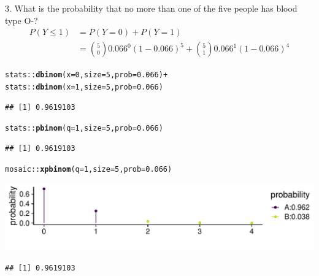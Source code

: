 \documentclass[10pt]{beamer}\usepackage[]{graphicx}\usepackage[]{color}
\makeatletter
\def\maxwidth{ %
  \ifdim\Gin@nat@width>\linewidth
    \linewidth
  \else
    \Gin@nat@width
  \fi
}
\newcommand{\hlnum}[1]{\textcolor[rgb]{0.686,0.059,0.569}{#1}}%
\newcommand{\hlopt}[1]{\textcolor[rgb]{0,0,0}{#1}}%
\newcommand{\hlstd}[1]{\textcolor[rgb]{0.345,0.345,0.345}{#1}}%
\newcommand{\hlkwc}[1]{\textcolor[rgb]{0.333,0.667,0.333}{#1}}%
\newcommand{\hlkwd}[1]{\textcolor[rgb]{0.737,0.353,0.396}{\textbf{#1}}}%
\newenvironment{kframe}{%
 \def\at@end@of@kframe{}%
 \ifinner\ifhmode%
  \def\at@end@of@kframe{\end{minipage}}%
  \begin{minipage}{\columnwidth}%
 \fi\fi%
 \def\FrameCommand##1{\hskip\@totalleftmargin \hskip-\fboxsep
 \colorbox{shadecolor}{##1}\hskip-\fboxsep
     \hskip-\linewidth \hskip-\@totalleftmargin \hskip\columnwidth}%
 \MakeFramed {\advance\hsize-\width
   \@totalleftmargin\z@ \linewidth\hsize
   \@setminipage}}%
 {\par\unskip\endMakeFramed%
 \at@end@of@kframe}
\newenvironment{knitrout}{}{} %
\makeatother
\begin{document}
\begin{frame}[fragile]{3. What is the probability that no more than one of the five people has blood type O-?}
	\footnotesize
	\begin{align*}
	P(Y \leq 1) & = P(Y = 0) + P(Y = 1) \\
	& = \binom{5}{0} 0.066^0 (1- 0.066)^5 + \binom{5}{1} 0.066^1 (1- 0.066)^4
	\end{align*}
	
	
\begin{knitrout}\tiny
{}\color{fgcolor}\begin{kframe}
\begin{alltt}
\hlstd{stats}\hlopt{::}\hlkwd{dbinom}\hlstd{(}\hlkwc{x} \hlstd{=} \hlnum{0}\hlstd{,} \hlkwc{size} \hlstd{=} \hlnum{5}\hlstd{,} \hlkwc{prob} \hlstd{=} \hlnum{0.066}\hlstd{)} \hlopt{+}
\hlstd{stats}\hlopt{::}\hlkwd{dbinom}\hlstd{(}\hlkwc{x} \hlstd{=} \hlnum{1}\hlstd{,} \hlkwc{size} \hlstd{=} \hlnum{5}\hlstd{,} \hlkwc{prob} \hlstd{=} \hlnum{0.066}\hlstd{)}
\end{alltt}
\begin{verbatim}
## [1] 0.9619103
\end{verbatim}
\begin{alltt}
\hlstd{stats}\hlopt{::}\hlkwd{pbinom}\hlstd{(}\hlkwc{q} \hlstd{=} \hlnum{1}\hlstd{,} \hlkwc{size} \hlstd{=} \hlnum{5}\hlstd{,} \hlkwc{prob} \hlstd{=} \hlnum{0.066}\hlstd{)}
\end{alltt}
\begin{verbatim}
## [1] 0.9619103
\end{verbatim}
\begin{alltt}
\hlstd{mosaic}\hlopt{::}\hlkwd{xpbinom}\hlstd{(}\hlkwc{q} \hlstd{=} \hlnum{1}\hlstd{,} \hlkwc{size} \hlstd{=} \hlnum{5}\hlstd{,} \hlkwc{prob} \hlstd{=} \hlnum{0.066}\hlstd{)}
\end{alltt}
\end{kframe}

{\centering \includegraphics[width=\maxwidth]{figure/unnamed-chunk-12-1} 

}


\begin{kframe}\begin{verbatim}
## [1] 0.9619103
\end{verbatim}
\end{kframe}
\end{knitrout}
	
\end{frame}
\end{document}
